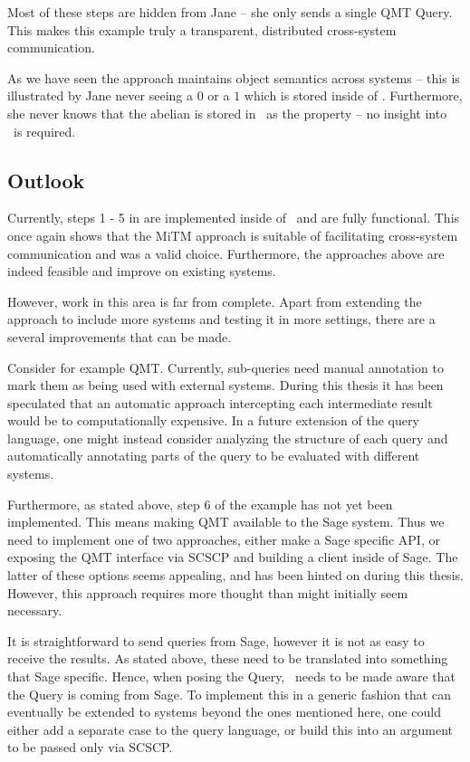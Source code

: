 Most of these steps are hidden from Jane -- she only sends a single QMT Query. 
This makes this example truly a transparent, distributed cross-system communication. 

As we have seen the approach maintains object semantics across systems -- this is illustrated by Jane never seeing a $0$ or a $1$ which is stored inside of \lmfdb. 
Furthermore, she never knows that the abelian is stored in \lmfdb\ as the  property -- no insight into \lmfdb\ is required. 

\subsection{Outlook}\label{sec:conclusion:outlook}

Currently, steps 1 - 5 in are implemented inside of \mmt\ and are fully functional. 
This once again shows that the MiTM approach is suitable of facilitating cross-system communication and was a valid choice. 
Furthermore, the approaches above are indeed feasible and improve on existing systems. 

However, work in this area is far from complete. 
Apart from extending the approach to include more systems and testing it in more settings, 
there are a several improvements that can be made. 

Consider for example QMT. 
Currently, sub-queries need manual annotation to mark them as being used with external systems. 
During this thesis it has been speculated that an automatic approach intercepting each intermediate result would be to computationally expensive. 
In a future extension of the query language, one might instead consider analyzing the structure of each query and automatically annotating parts of the query to be evaluated with different systems. 

Furthermore, as stated above, step 6 of the example has not yet been implemented. 
This means making QMT available to the Sage system.
Thus we need to implement one of two approaches, either make a Sage specific API, or exposing the QMT interface via SCSCP and building a client inside of Sage. 
The latter of these options seems appealing, and has been hinted on during this thesis. 
However, this approach requires more thought than might initially seem necessary. 

It is straightforward to send queries from Sage, however it is not as easy to receive the results. 
As stated above, these need to be translated into something that Sage specific. 
Hence, when posing the Query, \mmt\ needs to be made aware that the Query is coming from Sage. 
To implement this in a generic fashion that can eventually be extended to systems beyond the ones mentioned here, one could either add a separate case to the query language, or build this into an argument to be passed only via SCSCP. 
  
